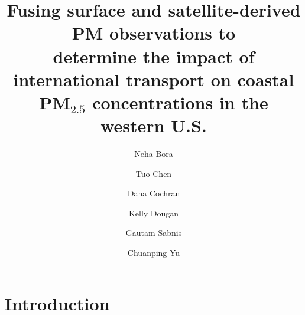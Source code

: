 \documentclass[notheorems,envcountsect,allowframebreaks,xcolor=svgnames,8pt]{beamer}
\title[Fusing AOD and PM$_{2.5}$ datasets]
{Fusing surface and satellite-derived PM observations to \\ determine the impact of international transport on coastal PM$_{2.5}$ concentrations in the western U.S.}
\author
{Neha Bora \and Tuo Chen \and Dana Cochran \and Kelly Dougan \and Gautam Sabnis \and Chuanping Yu}
\institute[SAMSI]
{Industrial Math/Stat Modeling Workshop \\ Environmental Protection Agency}
\begin{document}
\begin{frame}
\titlepage
\end{frame}

\section{Introduction}

\end{document}

